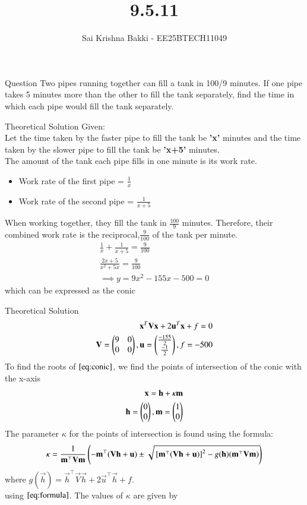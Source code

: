 \documentclass{beamer}
\title %
{9.5.11}
\date{}
\author %
{Sai Krishna Bakki - EE25BTECH11049}
\begin{document}
\frame{\titlepage}
\begin{frame}{Question}
Two pipes running together can fill a tank in 100/9 minutes. If one pipe takes 5 minutes more than the other to fill the tank separately, find the time in which each pipe would
fill the tank separately.
\end{frame}
\begin{frame}{Theoretical Solution}
    Given:\\
Let the time taken by the faster pipe to fill the tank be \textbf{'x'} minutes and the time taken by the slower pipe to fill the tank be \textbf{'x+5'} minutes.\\
The amount of the tank each pipe fills in one minute is its work rate.
\begin{itemize}
    \item Work rate of the first pipe = $\frac{1}{x}$
    \item Work rate of the second pipe = $\frac{1}{x+5}$
\end{itemize}
When working together, they fill the tank in $\frac{100}{9}$ minutes. Therefore, their combined work rate is the reciprocal,$\frac{9}{100}$ of the tank per minute.
\begin{align}
    \frac{1}{x}+\frac{1}{x+5}=\frac{9}{100}\\
    \frac{2x+5}{x^2+5x}=\frac{9}{100}\\
    \implies y=9x^2-155x-500=0\label{eq:conic}
\end{align}
which can be expressed as the conic
\end{frame}
\begin{frame}{Theoretical Solution}
\begin{align}
\mathbf{x}^{T}\mathbf{V}\mathbf{x}+2\mathbf{u}^T\mathbf{x}+f=0\\
\mathbf{V}=\begin{pmatrix}9&0\\0&0\end{pmatrix},\mathbf{u}=\begin{pmatrix}\frac{-155}{2}\\\frac{-1}{2}\end{pmatrix},f=-500
\end{align}
To find the roots of $\eqref{eq:conic}$, we find the points of intersection of the conic with the x-axis
\begin{align}
    \mathbf{x}=\mathbf{h}+\kappa\mathbf{m}\\
    \mathbf{h}=\begin{pmatrix}0\\0\end{pmatrix},\mathbf{m=\begin{pmatrix}1\\0\end{pmatrix}}
\end{align}
The parameter $\kappa$ for the points of intersection is found using the formula:
\begin{align}
\kappa = \frac{1}{\mathbf{m}^\top \mathbf{V} \mathbf{m}}\left(-\mathbf{m}^\top(\mathbf{V}\mathbf{h}+\mathbf{u}) \pm \sqrt{{}\left[\mathbf{m}^\top(\mathbf{V}\mathbf{h}+\mathbf{u})\right]^2 - g(\mathbf{h})(\mathbf{m}^\top \mathbf{V} \mathbf{m})}\right)\label{eq:formula}
\end{align}
where $g(\vec{h}) = \vec{h}^\top \vec{V} \vec{h} + 2\vec{u}^\top \vec{h} + f$.\\
using $\eqref{eq:formula}$. The values of $\kappa$ are given by
\end{frame}
\end{document}
